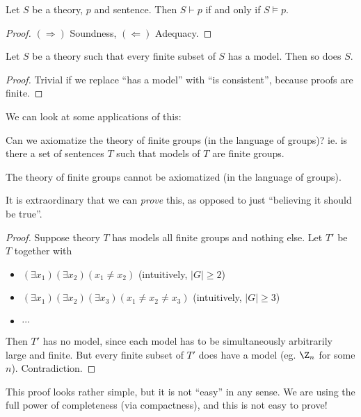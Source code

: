 \documentclass[a4paper]{article}
\begin{document}
\begin{thm}
  Let $S$ be a theory, $p$ and sentence. Then $S\vdash p$ if and only if $S \models p$.
\end{thm}

\begin{proof}
  $(\Rightarrow)$ Soundness, $(\Leftarrow)$ Adequacy.
\end{proof}

\begin{cor}
  Let $S$ be a theory such that every finite subset of $S$ has a model. Then so does $S$.
\end{cor}

\begin{proof}
  Trivial if we replace ``has a model'' with ``is consistent'', because proofs are finite.
\end{proof}

We can look at some applications of this:

Can we axiomatize the theory of finite groups (in the language of groups)? ie. is there a set of sentences $T$ such that models of $T$ are finite groups.

\begin{cor}
  The theory of finite groups cannot be axiomatized (in the language of groups).
\end{cor}
It is extraordinary that we can \emph{prove} this, as opposed to just ``believing it should be true''.

\begin{proof}
  Suppose theory $T$ has models all finite groups and nothing else.  Let $T'$ be $T$ together with
  \begin{itemize}
    \item $(\exists x_1)(\exists x_2)(x_1 \not = x_2)$ (intuitively, $|G| \geq 2$)
    \item $(\exists x_1)(\exists x_2)(\exists x_3)(x_1 \not= x_2 \not= x_3)$ (intuitively, $|G| \geq 3$)
    \item $\cdots$
  \end{itemize}
  Then $T'$ has no model, since each model has to be simultaneously arbitrarily large and finite. But every finite subset of  $T'$ does have a model (eg. $\Z_n$ for some $n$). Contradiction.
\end{proof}
This proof looks rather simple, but it is not ``easy'' in any sense. We are using the full power of completeness (via compactness), and this is not easy to prove!
\end{document}
